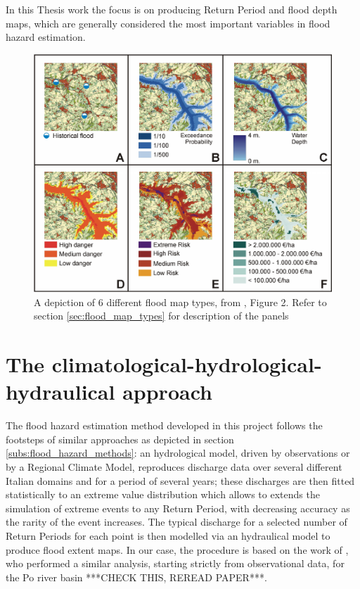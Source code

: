 In this Thesis work the focus is on producing Return Period and flood depth maps, which are generally considered the most important variables in flood hazard estimation.

\begin{figure}[h]
    \centering
    \includegraphics[width=\textwidth]{figures/flood_map_types}
    \decoRule
    \caption[Flood map types]{A depiction of 6 different flood map types, from  \citet{DeMoel2009}, Figure 2. Refer to section \ref{sec:flood_map_types} for description of the panels}
    \label{fig:flood_map_types}
\end{figure}

\section{The climatological-hydrological-hydraulical approach}
The flood hazard estimation method developed in this project follows the footsteps of similar approaches as depicted in section \ref{subs:flood_hazard_methods}: an hydrological model, driven by observations or by a Regional Climate Model, reproduces discharge data over several different Italian domains and for a period of several years; these discharges are then fitted statistically to an extreme value distribution which allows to extends the simulation of extreme events to any Return Period, with decreasing accuracy as the rarity of the event increases. The typical discharge for a selected number of Return Periods for each point is then modelled via an hydraulical model to produce flood extent maps. In our case, the procedure is based on the work of \citet{PAPER_MAIONE?}, who performed a similar analysis, starting strictly from observational data, for the Po river basin ***CHECK THIS, REREAD PAPER***.


